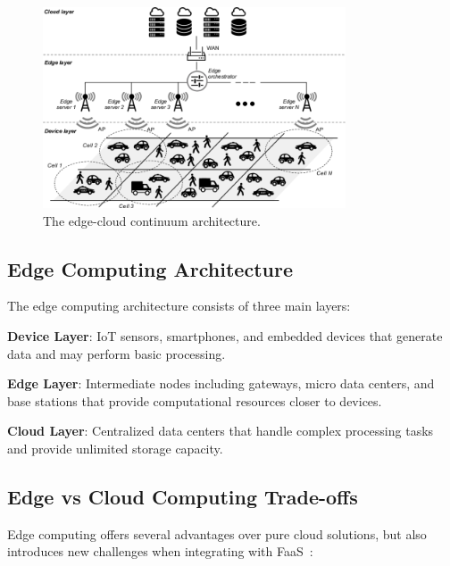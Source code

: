 \begin{figure}[h]
    \centering
    \includegraphics[width=0.8\textwidth]{Assets/Architecture-of-edge-computing.png}
    \caption{\small The edge-cloud continuum architecture. ~\cite{belcastro2023edge}}
    \label{fig:edge_architecture}
\end{figure}

\subsection{Edge Computing Architecture}

The edge computing architecture consists of three main layers:

\textbf{Device Layer}: IoT sensors, smartphones, and embedded devices that generate data and may perform basic processing.

\textbf{Edge Layer}: Intermediate nodes including gateways, micro data centers, and base stations that provide computational resources closer to devices.

\textbf{Cloud Layer}: Centralized data centers that handle complex processing tasks and provide unlimited storage capacity.

\subsection{Edge vs Cloud Computing Trade-offs}

Edge computing offers several advantages over pure cloud solutions, but also introduces new challenges when integrating with FaaS~\cite{jin2019when}:


